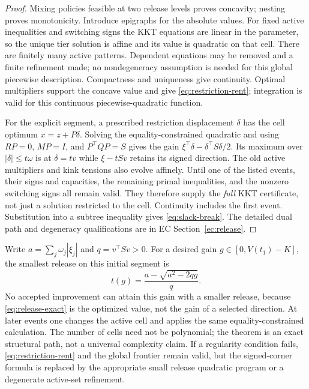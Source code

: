 \begin{proof}
Mixing policies feasible at two release levels proves concavity; nesting proves monotonicity. Introduce epigraphs for the absolute values. For fixed active inequalities and switching signs the KKT equations are linear in the parameter, so the unique tier solution is affine and its value is quadratic on that cell. There are finitely many active patterns. Dependent equations may be removed and a finite refinement made; no nondegeneracy assumption is needed for this global piecewise description. Compactness and uniqueness give continuity. Optimal multipliers support the concave value and give \eqref{eq:restriction-rent}; integration is valid for this continuous piecewise-quadratic function.

For the explicit segment, a prescribed restriction displacement $\delta$ has the cell optimum $x=z+P\delta$. Solving the equality-constrained quadratic and using
$RP=0$, $MP=I$, and $P^\top QP=S$ gives the gain
$\xi^\top\delta-\delta^\top S\delta/2$. Its maximum over $|\delta|\leq t\omega$ is at $\delta=tv$ while $\xi-tSv$ retains its signed direction. The old active multipliers and kink tensions also evolve affinely. Until one of the listed events, their signs and capacities, the remaining primal inequalities, and the nonzero switching signs all remain valid. They therefore supply the \emph{full} KKT certificate, not just a solution restricted to the cell. Continuity includes the first event. Substitution into a subtree inequality gives \eqref{eq:slack-break}. The detailed dual path and degeneracy qualifications are in EC Section~\ref{ec:release}.\end{proof}

Write $a=\sum_j\omega_j|\xi_j|$ and $q=v^\top Sv>0$. For a desired gain $g\in[0,V(t_1)-K]$, the smallest release on this initial segment is
\begin{equation}\label{eq:target}
 t(g)=\frac{a-\sqrt{a^2-2qg}}q.
\end{equation}
No accepted improvement can attain this gain with a smaller release, because \eqref{eq:release-exact} is the optimized value, not the gain of a selected direction. At later events one changes the active cell and applies the same equality-constrained calculation. The number of cells need not be polynomial; the theorem is an exact structural path, not a universal complexity claim. If a regularity condition fails, \eqref{eq:restriction-rent} and the global frontier remain valid, but the signed-corner formula is replaced by the appropriate small release quadratic program or a degenerate active-set refinement.

